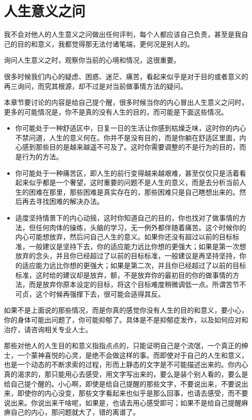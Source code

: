 \documentclass[12pt,oneside]{book}
\begin{document}
\section{人生意义之问}
我不会对他人的人生意义之问做出任何评判，每个人都应该自己负责，甚至是我自己的目的和意义，我都觉得那无法付诸笔端，更何况是别人的。

询问人生意义之时，观察你当前的心境和情况，这很重要。

很多时候我们内心的疑虑、困惑、迷茫、痛苦，看起来似乎是对于目的或者意义的再三询问，而究其根源，却不过是对当前做事情方法的疑问。

本章节要讨论的内容是给自己提个醒，很多时候当你的内心冒出人生意义之问时，更多的可能情况是，你不是真的没有人生的目的，而可能是下面这些情况。

\begin{itemize}
\item 你可能处于一种舒适区中，日复一日的生活让你感到枯燥乏味，这时你的内心不禁问道，人生的意义何在。你并不是没有目的，而是你躺在舒适区里面，内心感到那些目的是越来越遥不可及了。这时你需要调整的不是行为的目的，而是行为的方法。

\item 你可能处于一种痛苦区，即人生的前行变得越来越艰难，甚至仅仅只是活着看起来似乎都是一个奢望，这时重要的问题不是人生的意义，而是去分析当前人生的困难在那里，那些困难是真实存在的，那些困难只是自己瞎想出来的。然后再去寻找困难的解决办法。


\item 适度坚持情景下的内心动摇，这时你知道自己的目的，你也找对了做事情的方法，但任何肉体的操练，头脑的学习，无一例外都伴随着痛苦。这个时候你的内心可能想放弃，然后问自己人生的意义。如果你还没有超过以前的目标标准，一般建议是坚持下去，你的适应能力远比你想的更强大；如果是第一次想放弃的念头，并且你已经超过了以前的目标标准，一般建议是再坚持坚持，你的适应能力远比你想的更强大；如果是第二次，并且你已经超过了以前的目标标准，这时给的建议却是放弃，额，不是放弃你的最初目的你的做事情的方法，而是放弃你原本设定的目标，将这个目标难度稍微调低一点。所谓苦节不可贞，这个时候再强撑下去，很可能会适得其反。


\end{itemize}

如果不是上面说的那些情况，而是你真的感觉你没有人生的目的和意义，要小心，你的身体可能出问题了，你可能抑郁了。具体是不是抑郁症发作，以及如何应对和治疗，请咨询相关专业人士。

那些对他人的人生目的和意义指指点点的，只能证明自己是个流氓，一个真正的绅士，一个蒙神喜悦的心灵，是绝不会做这样的事。而即使对于自己的人生和意义，也是一个动态的不断求索的过程，形而上静态的文字是不可能描述出来的。你内心真的渴求的，那只能用心去感受，用文字写出来的，要么是装个别人看的，要么是给自己提个醒的。小心啊，即使是给自己提醒的那些文字，不要说出来，不要说出来，即使你的内心没变，那些文字看起来也似乎是那么回事，也请去感受，而不要说出来。你说出来干啥呢，如果是，也请去用心感受即可；如果不是给自己提醒麻痹自己的内心，那问题就大了，错的离谱了。
\end{document}
